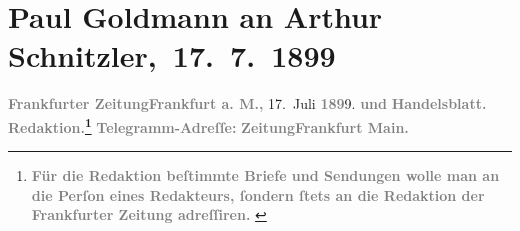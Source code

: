 

         
         \renewcommand{\erwaehntePersonen}{Personen: Hermann Bahr, Max Eugen Burckhard, Rémy de Gourmont, Gisela Hajek, Heinrich Kanner, Louise Schnitzler}
         \renewcommand{\erwaehnteInstitutionen}{Institutionen: Burgtheater, Die Zeit. Wiener Wochenschrift, Frankfurter Zeitung, Neues Wiener Tagblatt, Wiener Rundschau, Österreichische Volks-Zeitung}
         \renewcommand{\erwaehnteOrte}{Orte: Frankfurt am Main, Paris, Velden am Wörthersee, Wien}
         \renewcommand{\erwaehnteWerke}{}
               \section[ Paul Goldmann an Arthur Schnitzler, 17. 7. 1899]{ Paul Goldmann an Arthur Schnitzler, 17. 7. 1899}\nopagebreak{}\rehead{ }\begin{ledgroupsized}[t]{13cm}\normalsize\beginnumbering \toendnotes[C]{\smallbreak\pagebreak[2]} 
\toendnotes[C]{\smallbreak}\pstart
           \noindent{}{\pb}\textcolor{gray}{\textbf{\textbf{Frankfurter Zeitung}}}\hfill \textcolor{gray}{\textbf{\textbf{Frankfurt a.
                        M.,}}}{ }17. Juli \textcolor{gray}{\textbf{189}}9.\pend
           \pstart
           \textcolor{gray}{\textbf{und}}\pend
           \pstart
           \textcolor{gray}{\textbf{Handelsblatt. }}\pend
           \pstart
           \textcolor{gray}{\textbf{\textbf{Redaktion.}\footnote{\noindent{}\textcolor{gray}{\textbf{Für die Redaktion beſtimmte Briefe und Sendungen wolle man
                                  an die Perſon eines Redakteurs,
                              ſondern ſtets \textbf{an die Redaktion der Frankfurter Zeitung} adreſſiren. }}}}}\pend
           \pstart
           \textcolor{gray}{\textbf{Telegramm-Adreſſe:}}\pend
           \pstart
           \textcolor{gray}{\textbf{\textbf{ZeitungFrankfurt Main.}}}\pend

\end{ledgroupsized}
